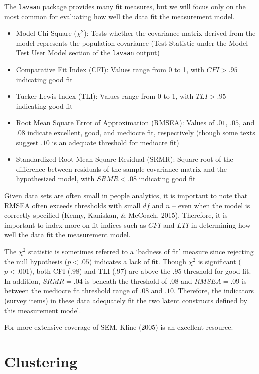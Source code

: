 \documentclass[
]{book}
\providecommand{\tightlist}{%
  \setlength{\itemsep}{0pt}\setlength{\parskip}{0pt}}
\begin{document}
The \texttt{lavaan} package provides many fit measures, but we will focus only on the most common for evaluating how well the data fit the measurement model.

\begin{itemize}
\tightlist
\item
  Model Chi-Square (\(\chi^2\)): Tests whether the covariance matrix derived from the model represents the population covariance (Test Statistic under the Model Test User Model section of the \texttt{lavaan} output)
\item
  Comparative Fit Index (CFI): Values range from 0 to 1, with \(CFI > .95\) indicating good fit
\item
  Tucker Lewis Index (TLI): Values range from 0 to 1, with \(TLI > .95\) indicating good fit
\item
  Root Mean Square Error of Approximation (RMSEA): Values of \(.01\), \(.05\), and \(.08\) indicate excellent, good, and mediocre fit, respectively (though some texts suggest \(.10\) is an adequate threshold for mediocre fit)
\item
  Standardized Root Mean Square Residual (SRMR): Square root of the difference between residuals of the sample covariance matrix and the hypothesized model, with \(SRMR < .08\) indicating good fit
\end{itemize}

Given data sets are often small in people analytics, it is important to note that RMSEA often exceeds thresholds with small \(df\) and \(n\) -- even when the model is correctly specified (Kenny, Kaniskan, \& McCoach, 2015). Therefore, it is important to index more on fit indices such as \(CFI\) and \(LTI\) in determining how well the data fit the measurement model.

The \(\chi^2\) statistic is sometimes referred to a `badness of fit' measure since rejecting the null hypothesis (\(p < .05\)) indicates a lack of fit. Though \(\chi^2\) is significant (\(p < .001\)), both CFI (\(.98\)) and TLI (\(.97\)) are above the \(.95\) threshold for good fit. In addition, \(SRMR = .04\) is beneath the threshold of \(.08\) and \(RMSEA = .09\) is between the mediocre fit threshold range of \(.08\) and \(.10\). Therefore, the indicators (survey items) in these data adequately fit the two latent constructs defined by this measurement model.

For more extensive coverage of SEM, Kline (2005) is an excellent resource.

\hypertarget{clustering}{%
\section{Clustering}\label{clustering}}
\end{document}
